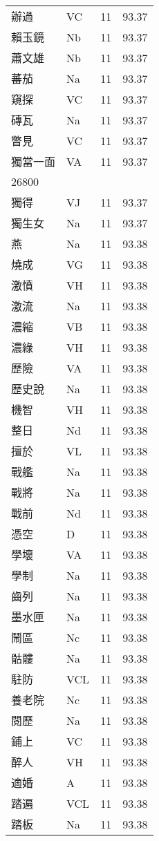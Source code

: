 \documentclass[twocolumn]{book}
\begin{document}
\begin{supertabular}{llrr}
辦過 & VC & 11 &  93.37\\
賴玉鏡 & Nb & 11 &  93.37\\
蕭文雄 & Nb & 11 &  93.37\\
蕃茄 & Na & 11 &  93.37\\
窺探 & VC & 11 &  93.37\\
磚瓦 & Na & 11 &  93.37\\
瞥見 & VC & 11 &  93.37\\
獨當一面 & VA & 11 &  93.37\\
26800\\
獨得 & VJ & 11 &  93.37\\
獨生女 & Na & 11 &  93.37\\
燕 & Na & 11 &  93.38\\
燒成 & VG & 11 &  93.38\\
激憤 & VH & 11 &  93.38\\
激流 & Na & 11 &  93.38\\
濃縮 & VB & 11 &  93.38\\
濃綠 & VH & 11 &  93.38\\
歷險 & VA & 11 &  93.38\\
歷史說 & Na & 11 &  93.38\\
機智 & VH & 11 &  93.38\\
整日 & Nd & 11 &  93.38\\
擅於 & VL & 11 &  93.38\\
戰艦 & Na & 11 &  93.38\\
戰將 & Na & 11 &  93.38\\
戰前 & Nd & 11 &  93.38\\
憑空 & D & 11 &  93.38\\
學壞 & VA & 11 &  93.38\\
學制 & Na & 11 &  93.38\\
齒列 & Na & 11 &  93.38\\
墨水匣 & Na & 11 &  93.38\\
鬧區 & Nc & 11 &  93.38\\
骷髏 & Na & 11 &  93.38\\
駐防 & VCL & 11 &  93.38\\
養老院 & Nc & 11 &  93.38\\
閱歷 & Na & 11 &  93.38\\
鋪上 & VC & 11 &  93.38\\
醉人 & VH & 11 &  93.38\\
適婚 & A & 11 &  93.38\\
踏遍 & VCL & 11 &  93.38\\
踏板 & Na & 11 &  93.38\\

\end{supertabular}
\end{document}

